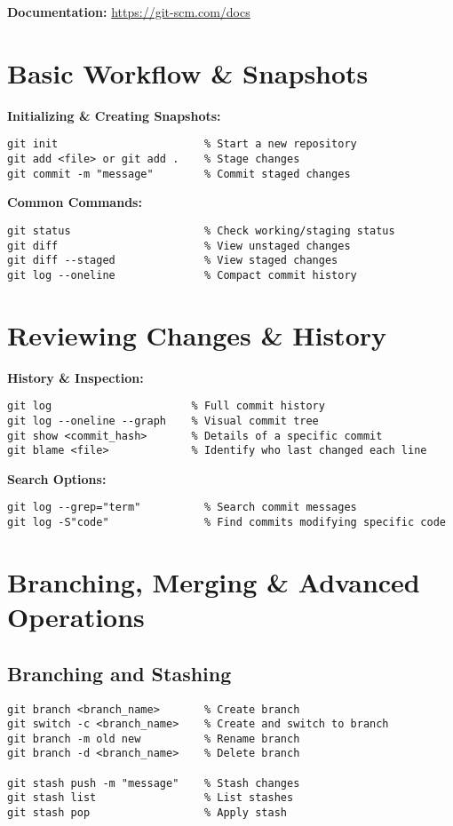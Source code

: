 \documentclass[a4paper,10pt]{article}
\begin{document}
\textbf{Documentation:} \url{https://git-scm.com/docs}

\section{Basic Workflow \& Snapshots}
\textbf{Initializing \& Creating Snapshots:}
\begin{lstlisting}
git init                       % Start a new repository
git add <file> or git add .    % Stage changes
git commit -m "message"        % Commit staged changes
\end{lstlisting}

\textbf{Common Commands:}
\begin{lstlisting}
git status                     % Check working/staging status
git diff                       % View unstaged changes
git diff --staged              % View staged changes
git log --oneline              % Compact commit history
\end{lstlisting}

\section{Reviewing Changes \& History}
\textbf{History & Inspection:}
\begin{lstlisting}
git log                      % Full commit history
git log --oneline --graph    % Visual commit tree
git show <commit_hash>       % Details of a specific commit
git blame <file>             % Identify who last changed each line
\end{lstlisting}

\textbf{Search Options:}
\begin{lstlisting}
git log --grep="term"          % Search commit messages
git log -S"code"               % Find commits modifying specific code
\end{lstlisting}

\section{Branching, Merging \& Advanced Operations}
\subsection{Branching and Stashing}
\begin{lstlisting}
git branch <branch_name>       % Create branch
git switch -c <branch_name>    % Create and switch to branch
git branch -m old new          % Rename branch
git branch -d <branch_name>    % Delete branch

git stash push -m "message"    % Stash changes
git stash list                 % List stashes
git stash pop                  % Apply stash
\end{lstlisting}
\end{document}
